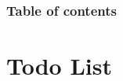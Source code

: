 \documentclass[9pt]{beamer}
\begin{document}


\begin{frame}%
	\frametitle{Table of contents}
	\tableofcontents[hideallsubsections]   %
\end{frame}

\section{Todo List}



% 

% 

\end{document}
